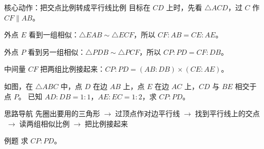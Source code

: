 \documentclass{exam-zh}
\begin{document}


\begin{eduSolutionBox}{核心动作：把交点比例转成平行线比例}
  \begingroup
  \setlength{\parskip}{2.5mm}
目标在 $CD$ 上时，先看 $\triangle ACD$，过 $C$ 作 $CF\parallel AB$。\par
外点 $E$ 看到一组相似：$\triangle EAB\sim\triangle ECF$，所以 $CF:AB=CE:AE$。\par
外点 $P$ 看到另一组相似：$\triangle PDB\sim\triangle PCF$，所以 $CP:PD=CF:DB$。\par
中间量 $CF$ 把两组比例接起来：$CP:PD=(AB:DB)\times(CE:AE)$。\par
  \endgroup
\end{eduSolutionBox}




\begin{eduProblemBlock}[例题]
\noindent
\begin{minipage}[t]{\dimexpr\linewidth-70mm-6mm\relax}
\vspace{0pt}
如图，在 $\triangle ABC$ 中，点 $D$ 在边 $AB$ 上，点 $E$ 在边 $AC$ 上，$CD$ 与 $BE$ 相交于点 $P$。
已知 $AD:DB=1:1$，$AE:EC=1:2$，求 $CP:PD$。

\end{minipage}\hfill
\begin{diagramcoltikz}{70mm}{第 1 步：先标出已知线和目标线。}
}
\end{diagramcoltikz}
\end{eduProblemBlock}





\begin{eduAuxItem}{思路导航}
先圈出要用的三角形$\;\to\;$过顶点作对边平行线$\;\to\;$找到平行线上的交点$\;\to\;$读两组相似比例$\;\to\;$把比例接起来\end{eduAuxItem}




\begin{eduSubQuestionItem}{例题}
求 $CP:PD$。\end{eduSubQuestionItem}
\end{document}
